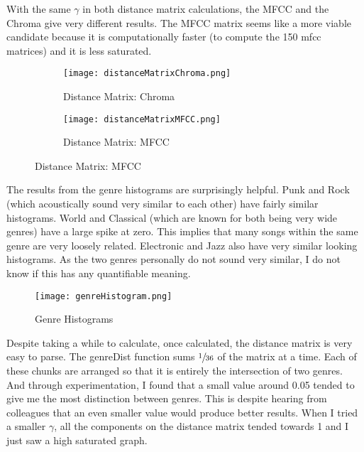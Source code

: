 \documentclass{article} %
\begin{document}
With the same $\gamma$ in both distance matrix calculations, the MFCC and the Chroma give very different results. The MFCC matrix seems like a more viable candidate because it is
computationally faster (to compute the 150 mfcc matrices) and it is less saturated. 

\begin{figure}[H]
\begin{subfigure}{0.5\textwidth}
\centering
\texttt{[image: distanceMatrixChroma.png]}
\caption{Distance Matrix: Chroma}
\label{fig:dMatChr}
\end{subfigure}
\begin{subfigure}{0.5\textwidth}
\centering
\texttt{[image: distanceMatrixMFCC.png]}
\caption{Distance Matrix: MFCC}
\label{fig:dMatChr}
\end{subfigure}
\end{figure}


 


The results from the genre histograms are surprisingly helpful. Punk and Rock (which acoustically sound very similar to each other) have fairly similar histograms. 
World and Classical (which are known for both being very wide genres) have a large spike at zero. This implies that many songs within the same genre are very loosely related. 
Electronic and Jazz also have very similar looking histograms. As the two genres personally do not sound very similar, I do not know if this has any quantifiable meaning. 

\begin{figure}[H]
\centering
\texttt{[image: genreHistogram.png]}
\caption{Genre Histograms}
\label{fig:genreHisto}
\end{figure}

 


Despite taking a while to calculate, once calculated, the distance matrix is very easy to parse. The genreDist function sums $\sfrac{1}{36}$ of the matrix at a time. Each of these
chunks are arranged so that it is entirely the intersection of two genres. 
And through experimentation, I found that a small value around 0.05 tended to give me the most distinction between genres. This is despite hearing from colleagues that an even
smaller value would produce better results. When I tried a smaller $\gamma$, all the components on the distance matrix tended towards 1 and I just saw a high saturated graph. 
\end{document}

